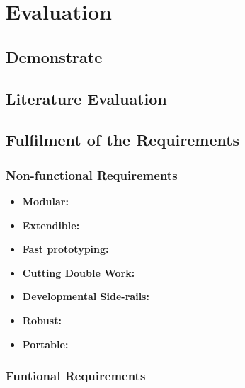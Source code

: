 \chapter{Evaluation}

\section{Demonstrate}

\section{Literature Evaluation}


\section{Fulfilment of the Requirements}

\subsection{Non-functional Requirements}
\begin{itemize}
	\item \textbf{Modular:} 
	\item \textbf{Extendible:} 
	\item \textbf{Fast prototyping:} 
	\item \textbf{Cutting Double Work:} 
	\item \textbf{Developmental Side-rails:} 
	\item \textbf{Robust:} 
	\item \textbf{Portable:} 
\end{itemize}

\subsection{Funtional Requirements}
